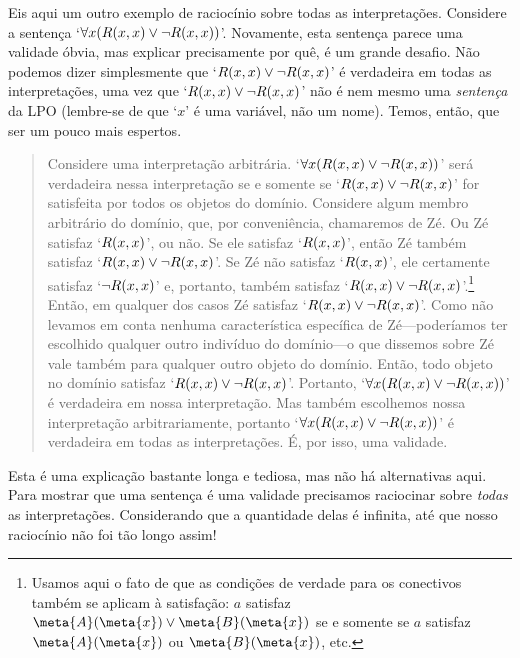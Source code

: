 Eis aqui um outro exemplo de raciocínio sobre todas as interpretações.
Considere a sentença `$\forall x(\mathord{R}(x,x)\vee\neg \mathord{R}(x,x))$'.
Novamente, esta sentença parece uma validade óbvia, mas explicar precisamente por quê, é um grande desafio.
Não podemos dizer simplesmente que `$\mathord{R}(x,x) \vee\neg \mathord{R}(x,x)$' é verdadeira em todas as interpretações, uma vez que `$\mathord{R}(x,x) \vee\neg \mathord{R}(x,x)$' não é nem mesmo uma \emph{sentença} da LPO (lembre-se de que `$x$' é uma variável, não um nome).
Temos, então, que ser um pouco mais espertos.
	\begin{quote}
		Considere uma interpretação arbitrária.
		`$\forall x(\mathord{R}(x,x)\vee \neg\mathord{R}(x,x))$' será verdadeira nessa interpretação se e somente se `$\mathord{R}(x,x)\vee\neg\mathord{R}(x,x)$' for satisfeita por todos os objetos do domínio.
		Considere algum membro arbitrário do domínio, que, por conveniência, chamaremos de Zé.
		Ou Zé satisfaz `$\mathord{R}(x,x)$', ou não.
		Se ele satisfaz `$\mathord{R}(x,x)$', então Zé também satisfaz `$\mathord{R}(x,x)\vee\neg\mathord{R}(x,x)$'.
		Se Zé não satisfaz `$\mathord{R}(x,x)$', ele certamente satisfaz `$\neg\mathord{R}(x,x)$' e, portanto, também satisfaz `$\mathord{R}(x,x)\vee\neg\mathord{R}(x,x)$'.\footnote{
			Usamos aqui o fato de que as condições de verdade para os conectivos também se aplicam à satisfação:
		$a$ satisfaz $\meta{A}(\meta{x}) \lor \meta{B}(\meta{x})$ se e somente se $a$ satisfaz $\meta{A}(\meta{x})$ ou $\meta{B}(\meta{x})$, etc.
		}
		Então, em qualquer dos casos Zé satisfaz `$\mathord{R}(x,x) \vee\neg \mathord{R}(x,x)$'.
		Como não levamos em conta nenhuma característica específica de Zé---poderíamos ter escolhido qualquer outro indivíduo do domínio---o que dissemos sobre Zé vale também para qualquer outro objeto do domínio.
		Então, todo objeto no domínio satisfaz `$\mathord{R}(x,x)\vee\neg\mathord{R}(x,x)$'.
		Portanto, `$\forall x (\mathord{R}(x,x) \vee\neg \mathord{R}(x,x))$' é verdadeira em nossa interpretação.
		Mas também escolhemos nossa interpretação arbitrariamente, portanto `$\forall x (\mathord{R}(x,x) \vee\neg \mathord{R}(x,x))$' é verdadeira em todas as interpretações.
		É, por isso, uma validade.
	\end{quote}
Esta é uma explicação bastante longa e tediosa, mas não há alternativas aqui. Para mostrar que uma sentença é uma validade precisamos raciocinar sobre \emph{todas} as interpretações.
Considerando que a quantidade delas é infinita, até que nosso raciocínio não foi tão longo assim!



